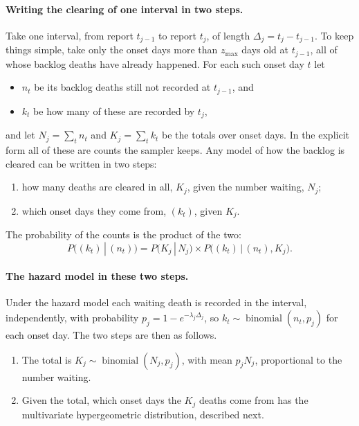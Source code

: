 \documentclass[11pt,a4paper]{article}
\newcommand{\given}{\,|\,}
\newcommand{\bin}{\operatorname{binomial}}
\begin{document}
\paragraph{Writing the clearing of one interval in two steps.} Take one
interval, from report $t_{j-1}$ to report $t_j$, of length
$\Delta_j=t_j-t_{j-1}$. To keep things simple, take only the onset days more
than $z_{\max}$ days old at $t_{j-1}$, all of whose backlog deaths have
already happened. For each such onset day $t$ let
\begin{itemize}
\item $n_t$ be its backlog deaths still not recorded at $t_{j-1}$, and
\item $k_t$ be how many of these are recorded by $t_j$,
\end{itemize}
and let $N_j=\sum_t n_t$ and $K_j=\sum_t k_t$ be the totals over onset
days. In the explicit form all of these are counts the sampler keeps. Any
model of how the backlog is cleared can be written in two steps:
\begin{enumerate}
\item how many deaths are cleared in all, $K_j$, given the number waiting,
$N_j$;
\item which onset days they come from, $(k_t)$, given $K_j$.
\end{enumerate}
The probability of the counts is the product of the two:
\[
P\bigl((k_t)\given(n_t)\bigr)=P\bigl(K_j\given N_j\bigr)\times
P\bigl((k_t)\given(n_t),K_j\bigr).
\]

\paragraph{The hazard model in these two steps.} Under the hazard model each
waiting death is recorded in the interval, independently, with probability
$p_j=1-e^{-\lambda_j\Delta_j}$, so $k_t\sim\bin(n_t,p_j)$ for each onset day.
The two steps are then as follows.
\begin{enumerate}
\item The total is $K_j\sim\bin(N_j,p_j)$, with mean $p_jN_j$, proportional
to the number waiting.
\item Given the total, which onset days the $K_j$ deaths come from has the
multivariate hypergeometric distribution, described next.
\end{enumerate}
\end{document}
